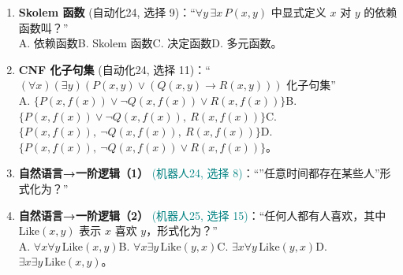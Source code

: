﻿\documentclass[../main.tex]{subfiles}
\begin{document}
\begin{enumerate}[itemsep=0.45em, topsep=0.2em, leftmargin=1.5em]
    \item \textbf{Skolem 函数} \textcolor{autoclassgreen}{(自动化24, 选择 9)}：``$\forall y\,\exists x\,P(x,y)$ 中显式定义 $x$ 对 $y$ 的依赖函数叫？''\\
    A. 依赖函数\quad B. Skolem 函数\quad C. 决定函数\quad D. 多元函数。 

    \item \textbf{CNF 化子句集} \textcolor{autoclassgreen}{(自动化24, 选择 11)}：``$(\forall x)(\exists y)(P(x,y)\lor(Q(x,y)\to R(x,y)))$ 化子句集''\\
    A. $\{P(x,f(x))\lor\lnot Q(x,f(x))\lor R(x,f(x))\}$\quad B. $\{P(x,f(x))\lor\lnot Q(x,f(x)),\ R(x,f(x))\}$\quad C. $\{P(x,f(x)),\ \lnot Q(x,f(x)),\ R(x,f(x))\}$\quad D. $\{P(x,f(x)),\ \lnot Q(x,f(x))\lor R(x,f(x))\}$。 

    \item \textbf{自然语言→一阶逻辑（1）} \textcolor{teal}{(机器人24, 选择 8)}：``''任意时间都存在某些人''形式化为？''\\
     

    \item \textbf{自然语言→一阶逻辑（2）} \textcolor{teal}{(机器人25, 选择 15)}：``任何人都有人喜欢，其中 $\mathrm{Like}(x,y)$ 表示 $x$ 喜欢 $y$，形式化为？''\\
    A. $\forall x\forall y\,\mathrm{Like}(x,y)$\quad B. $\forall x\exists y\,\mathrm{Like}(y,x)$\quad C. $\exists x\forall y\,\mathrm{Like}(y,x)$\quad D. $\exists x\exists y\,\mathrm{Like}(x,y)$。 
\end{enumerate}
\end{document}
